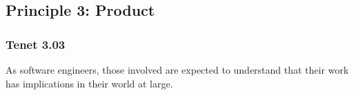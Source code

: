 
\subsection{Principle 3: Product}

\subsubsection{Tenet 3.03}


\par As software engineers, those involved are expected to understand that their work has implications in their world at large.


